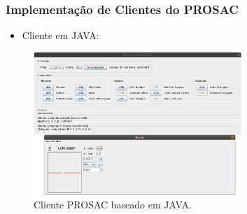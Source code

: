\begin{frame}
\frametitle {Implementação de Clientes do PROSAC}

\begin{itemize}
  \item Cliente em JAVA:	 
\end{itemize}

\begin{figure}
\centering
\includegraphics[width=0.7\textwidth]{image/prosac-java}
\caption {Cliente PROSAC baseado em JAVA.}
\label{fig:login}
\end{figure}
 
\end{frame}

